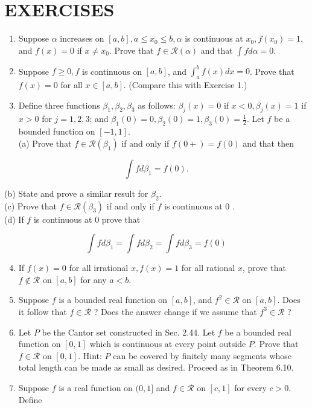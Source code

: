 \documentclass[10pt]{article}
\begin{document}
\section*{EXERCISES}
\begin{enumerate}
  \item Suppose $\alpha$ increases on $[a, b], a \leq x_{0} \leq b, \alpha$ is continuous at $x_{0}, f\left(x_{0}\right)=1$, and $f(x)=0$ if $x \neq x_{0}$. Prove that $f \in \mathscr{R}(\alpha)$ and that $\int f d \alpha=0$.
  \item Suppose $f \geq 0, f$ is continuous on $[a, b]$, and $\int_{a}^{b} f(x) d x=0$. Prove that $f(x)=0$ for all $x \in[a, b]$. (Compare this with Exercise 1.)
  \item Define three functions $\beta_{1}, \beta_{2}, \beta_{3}$ as follows: $\beta_{j}(x)=0$ if $x<0, \beta_{j}(x)=1$ if $x>0$ for $j=1,2,3$; and $\beta_{1}(0)=0, \beta_{2}(0)=1, \beta_{3}(0)=\frac{1}{2}$. Let $f$ be a bounded function on $[-1,1]$.\\
(a) Prove that $f \in \mathscr{R}\left(\beta_{1}\right)$ if and only if $f(0+)=f(0)$ and that then
\end{enumerate}

$$
\int f d \beta_{1}=f(0) .
$$

(b) State and prove a similar result for $\beta_{2}$.\\
(c) Prove that $f \in \mathscr{R}\left(\beta_{3}\right)$ if and only if $f$ is continuous at 0 .\\
(d) If $f$ is continuous at 0 prove that

$$
\int f d \beta_{1}=\int f d \beta_{2}=\int f d \beta_{3}=f(0)
$$

\begin{enumerate}
  \setcounter{enumi}{3}
  \item If $f(x)=0$ for all irrational $x, f(x)=1$ for all rational $x$, prove that $f \notin \mathscr{R}$ on $[a, b]$ for any $a<b$.
  \item Suppose $f$ is a bounded real function on $[a, b]$, and $f^{2} \in \mathscr{R}$ on $[a, b]$. Does it follow that $f \in \mathscr{R}$ ? Does the answer change if we assume that $f^{3} \in \mathscr{R}$ ?
  \item Let $P$ be the Cantor set constructed in Sec. 2.44. Let $f$ be a bounded real function on $[0,1]$ which is continuous at every point outside $P$. Prove that $f \in \mathscr{R}$ on $[0,1]$. Hint: $P$ can be covered by finitely many segments whose total length can be made as small as desired. Proceed as in Theorem 6.10.
  \item Suppose $f$ is a real function on $(0,1]$ and $f \in \mathscr{R}$ on $[c, 1]$ for every $c>0$. Define
\end{enumerate}
\end{document}

